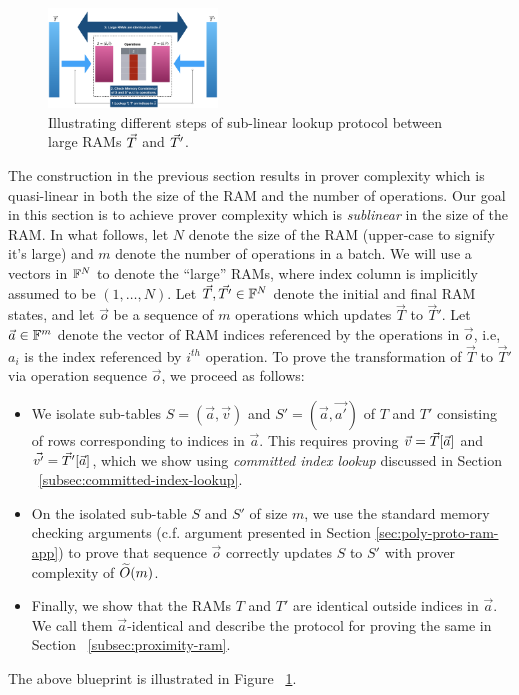 \begin{figure}[htbp]
    \centering
    \includegraphics[width=0.4\textwidth]{RAM-Lookup}
    \caption{Illustrating different steps of sub-linear lookup protocol between large RAMs $\vec{T}$ and $\vec{T}'$.}
    \label{fig:blueprint}
\end{figure}

The construction in the previous section results in prover complexity which is quasi-linear in both the
size of the RAM and the number of operations.
Our goal in this section is to achieve prover complexity which is {\em sublinear} in the size of the RAM.
In what follows, let $N$ denote the size of the RAM (upper-case to signify it's large) and $m$ denote the number
of operations in a batch. We will use a vectors in $\mathbb{F}^N$ to denote the ``large'' RAMs, where index column is implicitly
assumed to be $(1,\ldots,N)$.
Let $\vec{T},\vec{T'}\in \mathbb{F}^N$ denote the initial and final RAM states, and let $\vec{o}$ be
a sequence of $m$ operations which updates $\vec{T}$ to $\vec{T}'$. Let $\vec{a}\in \mathbb{F}^m$ denote the vector
of RAM indices referenced by the operations in $\vec{o}$, i.e, $a_i$ is the index referenced by $i^{th}$ operation.
To prove the transformation of $\vec{T}$ to $\vec{T}'$ via operation sequence $\vec{o}$, we proceed as follows:
\begin{itemize}[leftmargin=2em, label=-]
\item We isolate sub-tables $S=(\vec{a},\vec{v})$ and $S'=(\vec{a},\vec{a'})$ of $T$ and $T'$ consisting of
rows corresponding to indices in $\vec{a}$. This requires proving $\vec{v}=\vec{T}[\vec{a}]$ and $\vec{v'}=
\vec{T}'[\vec{a}]$, which we show using {\em committed index lookup} discussed in Section ~\ref{subsec:committed-index-lookup}.

\item On the isolated sub-table $S$ and $S'$ of size $m$, we use the standard memory checking arguments (c.f. argument
presented in Section \ref{sec:poly-proto-ram-app}) to prove that sequence $\vec{o}$ correctly updates $S$ to $S'$ with
prover complexity of $\widetilde{O}(m)$.

\item Finally, we show that the RAMs $T$ and $T'$ are identical outside indices in $\vec{a}$. We call them $\vec{a}$-identical
and describe the protocol for proving the same in Section ~\ref{subsec:proximity-ram}.
\end{itemize}
The above blueprint is illustrated in Figure ~\ref{fig:blueprint}.

